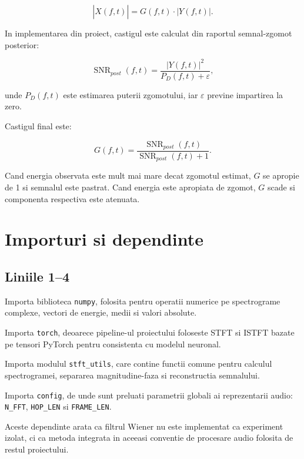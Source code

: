 \documentclass[12pt,a4paper]{report}
\newcommand{\codechunk}[2]{
    
}
\begin{document}
\[
|\hat{X}(f,t)| = G(f,t) \cdot |Y(f,t)|.
\]

In implementarea din proiect, castigul este calculat din raportul semnal-zgomot posterior:

\[
\operatorname{SNR}_{post}(f,t) =
\frac{|Y(f,t)|^2}{P_D(f,t) + \varepsilon},
\]

unde \(P_D(f,t)\) este estimarea puterii zgomotului, iar \(\varepsilon\) previne impartirea la zero.

Castigul final este:

\[
G(f,t) =
\frac{\operatorname{SNR}_{post}(f,t)}
{\operatorname{SNR}_{post}(f,t) + 1}.
\]

Cand energia observata este mult mai mare decat zgomotul estimat, \(G\) se apropie de 1 si semnalul este pastrat. Cand energia este apropiata de zgomot, \(G\) scade si componenta respectiva este atenuata.

\chapter{Importuri si dependinte}

\section{Liniile 1--4}

\codechunk{1}{4}

\begin{description}[leftmargin=2.8cm,style=nextline]
    \item[Linia 1] Importa biblioteca \texttt{numpy}, folosita pentru operatii numerice pe spectrograme complexe, vectori de energie, medii si valori absolute.
    \item[Linia 2] Importa \texttt{torch}, deoarece pipeline-ul proiectului foloseste STFT si ISTFT bazate pe tensori PyTorch pentru consistenta cu modelul neuronal.
    \item[Linia 3] Importa modulul \texttt{stft\_utils}, care contine functii comune pentru calculul spectrogramei, separarea magnitudine-faza si reconstructia semnalului.
    \item[Linia 4] Importa \texttt{config}, de unde sunt preluati parametrii globali ai reprezentarii audio: \texttt{N\_FFT}, \texttt{HOP\_LEN} si \texttt{FRAME\_LEN}.
\end{description}

Aceste dependinte arata ca filtrul Wiener nu este implementat ca experiment izolat, ci ca metoda integrata in aceeasi conventie de procesare audio folosita de restul proiectului.
\end{document}
